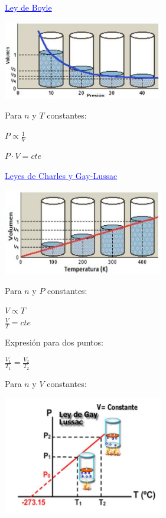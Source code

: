             \begin{center} \textcolor{blue}{\underline{Ley de Boyle}} \end{center} 
            \begin{center} \includegraphics[width=7cm]{./imagenes/graficaLeyBoyle.png} \end{center}
            \sangria{} Para $n$ y $T$ constantes:
            \begin{center} $P \propto \frac{1}{V}$ \end{center}
            \begin{center} $P \cdot V = cte$ \end{center}
            \begin{center} \textcolor{blue}{\underline{Leyes de Charles y Gay-Lussac}} \end{center} 
            \begin{center} \includegraphics[width=7cm]{./imagenes/graficaLeyCharlesYGayLussac1.png} \end{center}
            \sangria{} Para $n$ y $P$ constantes:
            \begin{center}
                $V \propto T$ \\
                $\frac{V}{T} = cte$
            \end{center}
            \sangria{} Expresión para dos puntos:
            \begin{center} $\frac{V_1}{T_1} = \frac{V_2}{T_2}$ \end{center}
            \sangria{} Para $n$ y $V$ constantes:
            \saltoPag{}
            \begin{center} \includegraphics[width=7cm]{./imagenes/graficaLeyCharlesYGayLussac2.png} \end{center}
